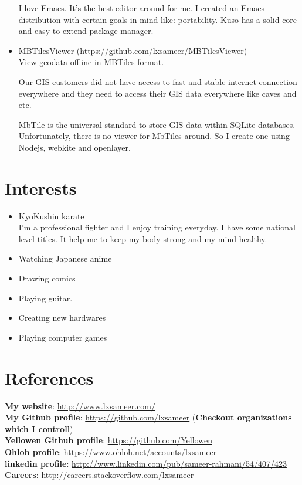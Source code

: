 \documentclass[a4paper,11pt]{article}
\begin{document}
\begin{itemize}
  I love Emacs. It's the best editor around for me. I created an
  Emacs distribution with certain goals in mind like: portability.
  Kuso has a solid core and easy to extend package manager.

\item MBTilesViewer (\url{https://github.com/lxsameer/MBTilesViewer})\\
  View geodata offline in MBTiles format.

  Our GIS customers did not have access to fast and stable internet
  connection everywhere and they need to access their GIS data everywhere
  like caves and etc.

  MbTile is the universal standard to store GIS data within SQLite databases.
  Unfortunately, there is no viewer for MbTiles around. So I create one using Nodejs,
  webkite and openlayer.

\end{itemize}



\section*{Interests}
\begin{itemize}

\item KyoKushin karate\\
  I’m a professional fighter and I enjoy training everyday. I have some national
  level titles. It help me to keep my body strong and my mind healthy.

\item Watching Japanese anime
\item Drawing comics
\item Playing guitar.
\item Creating new hardwares
\item Playing computer games
\end{itemize}

\section*{References}
\textbf{My website}: \url{http://www.lxsameer.com/}\\
\textbf{My Github profile}:  \url{https://github.com/lxsameer} (\textbf{Checkout organizations which I controll})\\
\textbf{Yellowen Github profile}: \url{https://github.com/Yellowen}\\
\textbf{Ohloh profile}: \url{https://www.ohloh.net/accounts/lxsameer}\\
\textbf{linkedin profile}: \url{http://www.linkedin.com/pub/sameer-rahmani/54/407/423}\\
\textbf{Careers}: \url{http://careers.stackoverflow.com/lxsameer}\\
\end{document}
